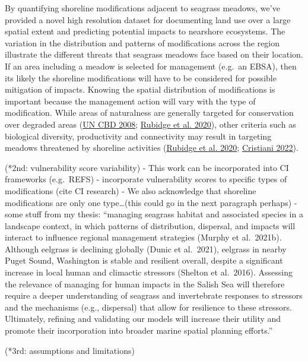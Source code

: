 \documentclass[12pt]{article}\usepackage[]{graphicx}\usepackage[]{color}
\begin{document}
By quantifying shoreline modifications adjacent to seagrass meadows, we've provided a novel high resolution dataset for documenting land use over a large spatial extent and predicting potential impacts to nearshore ecosystems. The variation in the distribution and patterns of modifications across the region illustrate the different threats that seagrass meadows face based on their location. If an area including a meadow is selected for management (e.g.~an EBSA), then its likely the shoreline modifications will have to be considered for possible mitigation of impacts. Knowing the spatial distribution of modifications is important because the management action will vary with the type of modification. While areas of naturalness are generally targeted for conservation over degraded areas (\protect\hyperlink{ref-UNCBD2008}{UN CBD 2008}; \protect\hyperlink{ref-Rubidge2020}{Rubidge et al. 2020}), other criteria such as biological diversity, productivity and connectivity may result in targeting meadows threatened by shoreline activities (\protect\hyperlink{ref-Rubidge2020}{Rubidge et al. 2020}; \protect\hyperlink{ref-cristiani2022}{Cristiani 2022}).

(*2nd: vulnerability score variability) - This work can be incorporated into CI frameworks (e.g.~REFS) - incorporate vulnerability scores to specific types of modifications (cite CI research) - We also acknowledge that shoreline modifications are only one type\ldots(this could go in the next paragraph perhaps) - some stuff from my thesis: ``managing seagrass habitat and associated species in a landscape context, in which patterns of distribution, dispersal, and impacts will interact to influence regional management strategies (Murphy et al.~2021b). Although eelgrass is declining globally (Dunic et al.~2021), eelgrass in nearby Puget Sound, Washington is stable and resilient overall, despite a significant increase in local human and climactic stressors (Shelton et al.~2016). Assessing the relevance of managing for human impacts in the Salish Sea will therefore require a deeper understanding of seagrass and invertebrate responses to stressors and the mechanisms (e.g., dispersal) that allow for resilience to these stressors. Ultimately, refining and validating our models will increase their utility and promote their incorporation into broader marine spatial planning efforts.''

(*3rd: assumptions and limitations)
\end{document}
